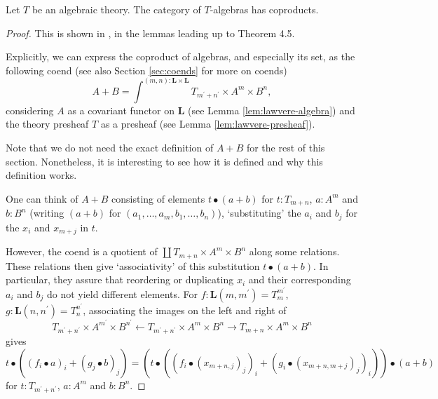 \begin{lemma}\label{lem:algebra-coproducts}
  Let $ T $ be an algebraic theory. The category of $ T $-algebras has coproducts.
\end{lemma}
\begin{proof}
  This is shown in \autocite{algebraic-theories-2010}, in the lemmas leading up to Theorem 4.5.

  Explicitly, we can express the coproduct of algebras, and especially its set, as the following coend \autocite[][Proposition 2.5]{Hyland} (see also Section \ref{sec:coends} for more on coends)
  \[ A + B = \int^{(m, n) : \mathbf L \times \mathbf L} T_{m^\prime + n^\prime} \times A^m \times B^n, \]
  considering $ A $ as a covariant functor on $ \mathbf L $ (see Lemma \ref{lem:lawvere-algebra}) and the theory presheaf $ T $ as a presheaf (see Lemma \ref{lem:lawvere-presheaf}).

  Note that we do not need the exact definition of $ A + B $ for the rest of this section. Nonetheless, it is interesting to see how it is defined and why this definition works.

  One can think of $ A + B $ consisting of elements $ t \bullet (a + b) $ for $ t: T_{m + n} $, $ a : A^m $ and $ b: B^n $ (writing $ (a + b) $ for $ (a_1, \dots, a_m, b_1, \dots, b_n) $), `substituting' the $ a_i $ and $ b_j $ for the $ x_i $ and $ x_{m + j} $ in $ t $.

  However, the coend is a quotient of $ \coprod T_{m + n} \times A^m \times B^n $ along some relations. These relations then give `associativity' of this substitution $ t \bullet (a + b) $. In particular, they assure that reordering or duplicating $ x_i $ and their corresponding $ a_i $ and $ b_j $ do not yield different elements. For $ f: \mathbf L(m, m^\prime) = T_m^{m^\prime} $, $ g: \mathbf L(n, n^\prime) = T_n^{n^\prime} $, associating the images on the left and right of
  \[ T_{m^\prime + n^\prime} \times A^{m^\prime} \times B^{n^\prime} \leftarrow T_{m^\prime + n^\prime} \times A^m \times B^n \rightarrow T_{m + n} \times A^m \times B^n \]
  gives
  \[ t \bullet ((f_i \bullet a)_i + (g_j \bullet b)_j) = (t \bullet ((f_i \bullet (x_{m + n, j})_j)_i + (g_i \bullet (x_{m + n, m + j})_j)_i)) \bullet (a + b) \]
  for $ t : T_{m^\prime + n^\prime} $, $ a : A^m $ and $ b : B^n $.


\end{proof}
